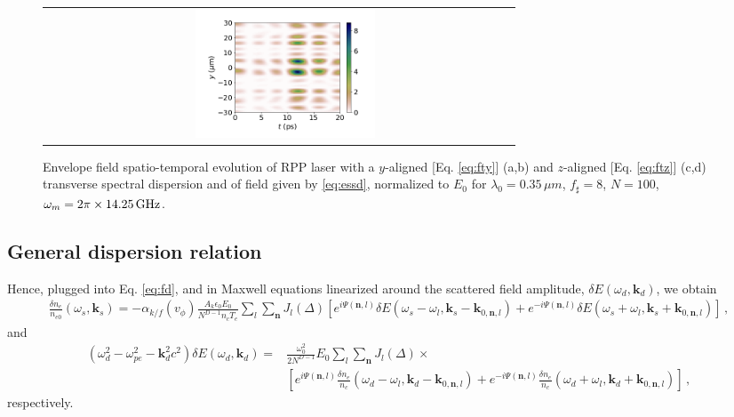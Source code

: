 \documentclass[
 reprint,
 amsmath,amssymb,
 aps,
]{revtex4-1}
\begin{document}
\begin{widetext}
\begin{figure}
\begin{tabular}{cc}
         &  \includegraphics[width=0.4\textwidth]{ESSD_yt_m10_ft0.png}
    \end{tabular}
    \caption{Envelope field spatio-temporal evolution of RPP  laser with a $y$-aligned  [Eq. \eqref{eq:fty}] (a,b) and $z$-aligned  [Eq. \eqref{eq:ftz}] (c,d) transverse spectral  dispersion and of field given by  \eqref{eq:essd}, normalized to $E_0$ for $\lambda_0=0.35\, \mu m$, $f_\sharp = 8$, $N=100$, $\omega_m =2\pi\times  14.25\, \rm GHz$. }
    \label{fig:essd}
\end{figure}

\subsection{General dispersion relation}
Hence, plugged into Eq. \eqref{eq:fd},  and in Maxwell equations linearized around the scattered field amplitude, $\delta E(\omega_d,\mathbf{k}_d) $, we obtain
\begin{align}
   \frac{\delta n_e }{n_{e0}}(\omega_s,\mathbf{k}_s) = -\alpha_{k/f}(v_\phi) \frac{A_k\epsilon_0 E_0}{N^{D-1} n_c T_e}   \sum_{l} \sum_{\mathbf{n}}  J_l(\Delta) \left[  
     e^{i \Psi(\mathbf{n},l)} \delta E (\omega_s-\omega_l, \mathbf{k}_s-\mathbf{k}_{0,\mathbf{n},l})  
   +e^{-i \Psi(\mathbf{n},l)  } \delta E(\omega_s+\omega_l, \mathbf{k}_s+\mathbf{k}_{0,\mathbf{n},l})
   \right]
   \, ,\label{eq:fssd} 
\end{align}
and  
\begin{align}
    (\omega_d^2 - \omega_{pe}^2 -\mathbf{k}_d^2c^2)\delta E(\omega_d,\mathbf{k}_d) =& \frac{\omega_0^2}{2N^{D-1}} E_0 \sum_l\sum_{\mathbf{n}  }  J_l(\Delta)  \times \nonumber \\ &\left[
    e^{i\Psi(\mathbf{n},l)}\frac{\delta n_e }{n_c}(\omega_d-\omega_l, \mathbf{k}_d-\mathbf{k}_{0,\mathbf{n},l})
    +e^{-i\Psi(\mathbf{n},l)}\frac{\delta n_e }{n_c}(\omega_d+\omega_l, \mathbf{k}_d+\mathbf{k}_{0,\mathbf{n},l}) \right] \, ,\label{eq:maxssd}
\end{align}
respectively.


\end{widetext}
\end{document}
